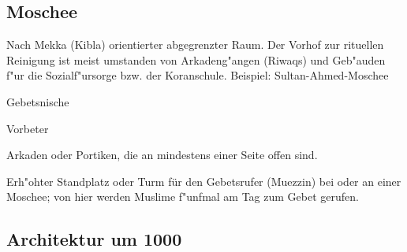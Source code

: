 \documentclass[emulatestandardclasses]{scrartcl}
\begin{document}
\subsection{Moschee}

\begin{description}[leftmargin=!,labelwidth=\widthof{\bfseries Thoraschrein}]
  \item[Allgemeines] Nach Mekka (Kibla) orientierter abgegrenzter Raum. Der Vorhof zur rituellen Reinigung ist meist umstanden von Arkadeng"angen (Riwaqs) und Geb"auden f"ur die Sozialf"ursorge bzw. der Koranschule. Beispiel: Sultan-Ahmed-Moschee
  \item[Mihrab] Gebetsnische
  \item[Imam] Vorbeter
  \item[Riwaq] Arkaden oder Portiken, die an mindestens einer Seite offen sind.
  \item[Minarett] Erh"ohter Standplatz oder Turm für den Gebetsrufer (Muezzin) bei oder an einer Moschee; von hier werden Muslime f"unfmal am Tag zum Gebet gerufen. 
\end{description}

\subsection{Architektur um 1000}







\end{document}
